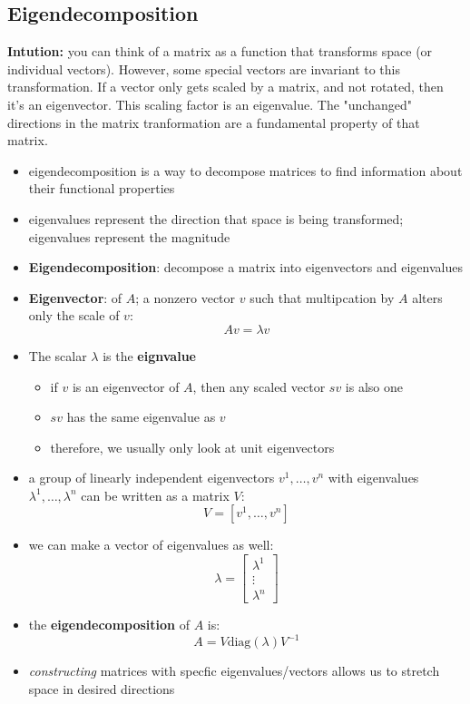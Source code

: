 \subsection{Eigendecomposition}
\textbf{Intution:} you can think of a matrix as a function that transforms space (or individual vectors). However, some special vectors are invariant to this transformation. If a vector only gets scaled by a matrix, and not rotated, then it's an eigenvector. This scaling factor is an eigenvalue. The "unchanged" directions in the matrix tranformation are a fundamental property of that matrix.
\begin{itemize}
    \item eigendecomposition is a way to decompose matrices to find information about their functional properties
    \item eigenvalues represent the direction that space is being transformed; eigenvalues represent the magnitude
    \item \textbf{Eigendecomposition}: decompose a matrix into eigenvectors and eigenvalues
    \item \textbf{Eigenvector}: of $A$; a nonzero vector $v$ such that multipcation by $A$ alters only the scale of $v$:
    $$ A v = \lambda v$$
    \item The scalar $\lambda$ is the \textbf{eignvalue}
    \begin{itemize}
        \item if $v$ is an eigenvector of $A$, then any scaled vector $sv$ is also one
        \item $sv$ has the same eigenvalue as $v$
        \item therefore, we usually only look at unit eigenvectors
    \end{itemize}
    \item a group of linearly independent eigenvectors ${v^1, \dots, v^n}$ with eigenvalues ${\lambda^1, \dots, \lambda^n}$ can be written as a matrix $V$:
    $$ V = [v^1, \dots, v^n]$$
    \item we can make a vector of eigenvalues as well:
    $$ \lambda = \begin{bmatrix}
        \lambda^1 \\
        \vdots \\
        \lambda^n 
    \end{bmatrix}$$
    \item the \textbf{eigendecomposition} of $A$ is:
    $$ A = V \text{diag}(\lambda)V^{-1}$$
    \item \textit{constructing} matrices with specfic eigenvalues/vectors allows us to stretch space in desired directions

\end{itemize}

